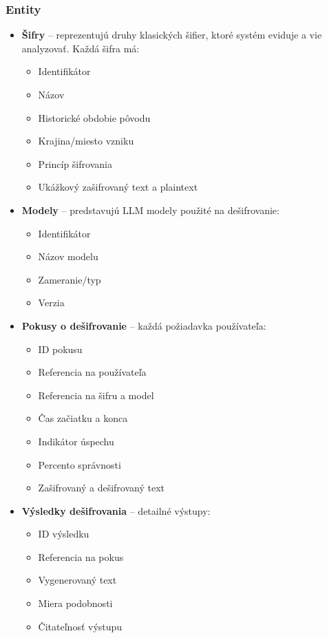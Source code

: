 \documentclass[12pt,a4paper]{article}
\begin{document}
\subsubsection{Entity}
\begin{itemize}
    \item \textbf{Šifry} -- reprezentujú druhy klasických šifier, ktoré systém eviduje a vie analyzovať. Každá šifra má:
    \begin{itemize}
        \item Identifikátor
        \item Názov
        \item Historické obdobie pôvodu
        \item Krajina/miesto vzniku
        \item Princíp šifrovania
        \item Ukážkový zašifrovaný text a plaintext
    \end{itemize}
    
    \item \textbf{Modely} -- predstavujú LLM modely použité na dešifrovanie:
    \begin{itemize}
        \item Identifikátor
        \item Názov modelu
        \item Zameranie/typ
        \item Verzia
    \end{itemize}
    
    \item \textbf{Pokusy o dešifrovanie} -- každá požiadavka používateľa:
    \begin{itemize}
        \item ID pokusu
        \item Referencia na používateľa
        \item Referencia na šifru a model
        \item Čas začiatku a konca
        \item Indikátor úspechu
        \item Percento správnosti
        \item Zašifrovaný a dešifrovaný text
    \end{itemize}
    
    \item \textbf{Výsledky dešifrovania} -- detailné výstupy:
    \begin{itemize}
        \item ID výsledku
        \item Referencia na pokus
        \item Vygenerovaný text
        \item Miera podobnosti
        \item Čitateľnosť výstupu
    \end{itemize}
    

\end{itemize}
\end{document}

